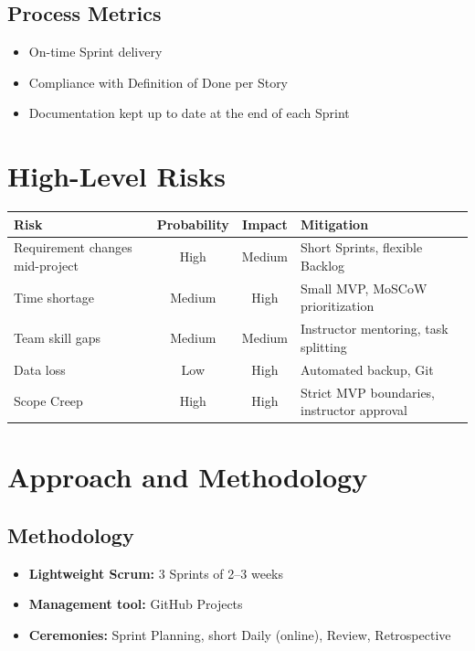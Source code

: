\documentclass[12pt, a4paper]{article}
\begin{document}
\subsection{Process Metrics}
\begin{itemize}
    \item On-time Sprint delivery
    \item Compliance with Definition of Done per Story
    \item Documentation kept up to date at the end of each Sprint
\end{itemize}

\section{High-Level Risks}

\begin{center}
\begin{tabular}{|p{4cm}|c|c|p{4cm}|}
\hline
\textbf{Risk} & \textbf{Probability} & \textbf{Impact} & \textbf{Mitigation} \\
\hline
Requirement changes mid-project & High & Medium & Short Sprints, flexible Backlog \\
\hline
Time shortage & Medium & High & Small MVP, MoSCoW prioritization \\
\hline
Team skill gaps & Medium & Medium & Instructor mentoring, task splitting \\
\hline
Data loss & Low & High & Automated backup, Git \\
\hline
Scope Creep & High & High & Strict MVP boundaries, instructor approval \\
\hline
\end{tabular}
\end{center}

\section{Approach and Methodology}

\subsection{Methodology}
\begin{itemize}
    \item \textbf{Lightweight Scrum:} 3 Sprints of 2--3 weeks
    \item \textbf{Management tool:} GitHub Projects
    \item \textbf{Ceremonies:} Sprint Planning, short Daily (online), Review, Retrospective
\end{itemize}
\end{document}
